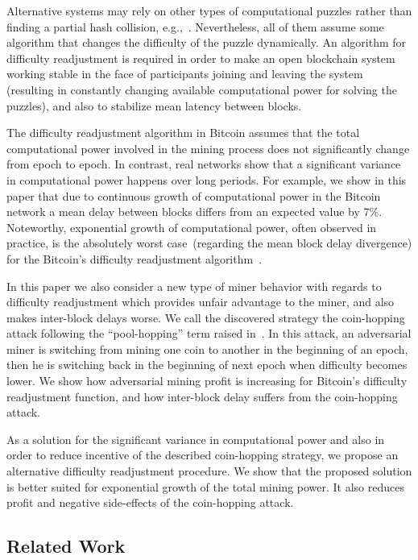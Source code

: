 \documentclass[]{llncs}
\newcommand{\attackname}{coin-hopping attack}
\begin{document}
Alternative systems may rely on other types of computational puzzles rather than finding a partial hash collision, e.g.,~\cite{miller2014permacoin,biryukov2017equihash}. Nevertheless, all of them assume some algorithm that changes the difficulty of the puzzle dynamically. An algorithm for difficulty readjustment is required in order to make an open blockchain system working stable in the face of participants joining and leaving the system (resulting in constantly changing available computational power for solving the puzzles), and also to stabilize mean latency between blocks. 

The difficulty readjustment algorithm in Bitcoin assumes that the total computational power involved in the mining process does not significantly change from epoch to epoch. In contrast, real networks show that a significant variance in computational power happens over long periods.
For example, we show in this paper that due to continuous growth of computational power in the Bitcoin network a mean delay between blocks differs from an expected value by 7\%.
Noteworthy, exponential growth of computational power, often observed in practice, is the absolutely worst case~(regarding the mean block delay divergence) for the Bitcoin's difficulty readjustment algorithm~\cite{kraft2015difficulty}.
 
In this paper we also consider a new type of miner behavior with regards to difficulty readjustment which provides unfair advantage to the miner, and also makes inter-block delays worse. We call the discovered strategy the \attackname{} following the ``pool-hopping'' term raised in~\cite{rosenfeld2011analysis}. In this attack, an adversarial miner is switching from mining one coin to another in the beginning of an epoch, then he is switching back in the beginning of next epoch when difficulty becomes lower. We show how adversarial mining profit is increasing for Bitcoin's difficulty readjustment function, and how inter-block delay suffers from the \attackname{}.

As a solution for the significant variance in computational power and also in order to reduce incentive of the described coin-hopping strategy, we propose an alternative difficulty readjustment procedure. We show that the proposed solution is better suited for exponential growth of the total mining power. It also reduces profit and negative side-effects of the coin-hopping attack.

\subsection{Related Work}
\end{document}
